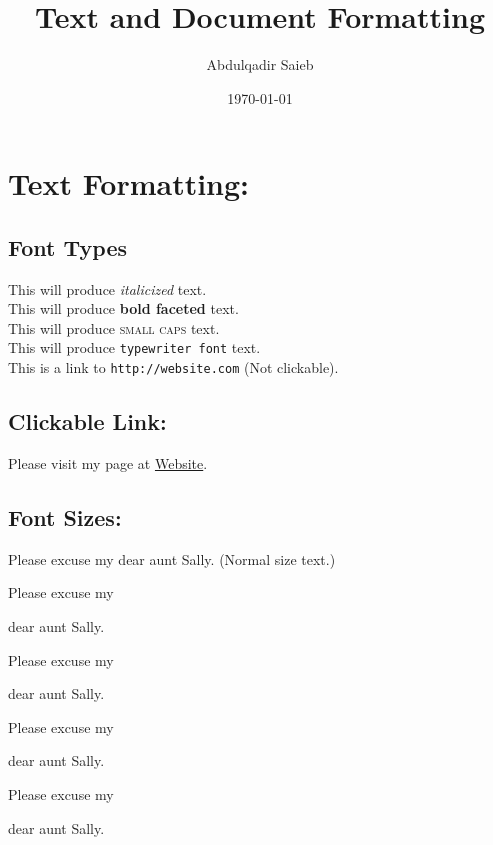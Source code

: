 \documentclass[11pt]{article}
\title{Text and Document Formatting}
\author{Abdulqadir Saieb}
\date{\today}
\begin{document}
\maketitle

\section{Text Formatting:}
\subsection{Font Types}
This will produce \textit{italicized} text.\\

This will produce \textbf{bold faceted} text.\\

This will produce \textsc{small caps} text.\\

This will produce \texttt{typewriter font} text.\\

This is a link to \texttt{http://website.com} (Not clickable).\\

\subsection{Clickable Link:}
Please visit my page at \href{https:/example.com}{Website}.\\

\subsection{Font Sizes:}
Please excuse my dear aunt Sally. (Normal size text.)

\vspace{1cm}
Please excuse my \begin{large}dear aunt Sally.
\end{large}

\vspace{1cm}
Please excuse my \begin{Large}dear aunt Sally.
\end{Large}

\vspace{1cm}
Please excuse my \begin{LARGE}dear aunt Sally.
\end{LARGE}


\vspace{1cm}
Please excuse my \begin{huge}dear aunt Sally.
\end{huge}
\end{document}
